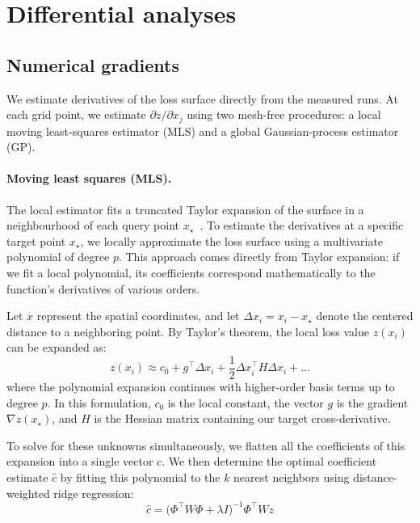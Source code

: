 \documentclass[]{fairmeta}
\begin{document}
\clearpage
\newpage
\beginappendix

\section{Differential analyses}\label{app:diff}
\subsection{Numerical gradients}
\label{app:numerical_gradients}

We estimate derivatives of the loss surface directly from the measured runs. At each grid point, we estimate $\partial z/\partial x_j$ using two mesh-free procedures: a local moving least-squares estimator (MLS) and a global Gaussian-process estimator (GP).

\paragraph{Moving least squares (MLS).} The local estimator fits a truncated Taylor expansion of the surface in a neighbourhood of each query point $x_\star$~\citep{lancaster1981surfaces}. To estimate the derivatives at a specific target point $x_\star$, we locally approximate the loss surface using a multivariate polynomial of degree $p$. This approach comes directly from Taylor expansion: if we fit a local polynomial, its coefficients correspond mathematically to the function's derivatives of various orders.

Let $x$ represent the spatial coordinates, and let $\Delta x_i = x_i - x_\star$ denote the centered distance to a neighboring point. By Taylor's theorem, the local loss value $z(x_i)$ can be expanded as:
$$ z(x_i) \approx c_0 + g^\top \Delta x_i + \frac{1}{2} \Delta x_i^\top H \Delta x_i + \dots $$
where the polynomial expansion continues with higher-order basis terms up to degree $p$. In this formulation, $c_0$ is the local constant, the vector $g$ is the gradient $\nabla z(x_\star)$, and $H$ is the Hessian matrix containing our target cross-derivative.

To solve for these unknowns simultaneously, we flatten all the coefficients of this expansion into a single vector $c$. We then determine the optimal coefficient estimate $\hat{c}$ by fitting this polynomial to the $k$ nearest neighbors using distance-weighted ridge regression:
$$ \hat{c} = \big(\Phi^\top W \Phi + \lambda I\big)^{-1}\Phi^\top W z $$
\end{document}
